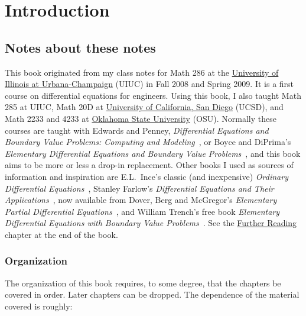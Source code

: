 \chapter*{Introduction} \label{intro:chapter}


\section{Notes about these notes}
\label{notes:section}



This book originated from my class notes for Math 286
at the \href{https://www.math.uiuc.edu/}{University of Illinois at
Urbana-Champaign} (UIUC)
in Fall 2008 and
Spring 2009.
It is a first course on differential equations for engineers.
Using this book, I also taught Math 285 at UIUC\@,
Math 20D at
\href{https://www.math.ucsd.edu/}{University of California, San Diego} (UCSD),
and Math 2233 and 4233 at 
\href{https://math.okstate.edu/}{Oklahoma State University} (OSU).
Normally these courses are taught with
Edwards and Penney, \emph{Differential
Equations and Boundary Value Problems: Computing and Modeling}~\cite{EP}, or
Boyce and DiPrima's
\emph{Elementary
Differential Equations and Boundary Value Problems}~\cite{BD},
and this book aims to be more or less a drop-in replacement.
Other books I used as sources of information and inspiration
are E.L.\ Ince's classic (and inexpensive)
\emph{Ordinary Differential Equations}~\cite{I},
Stanley Farlow's \emph{Differential Equations and Their
Applications}~\cite{F}, now available from Dover,
Berg and McGregor's
\emph{Elementary Partial Differential Equations}~\cite{BM},
and William Trench's free book
\emph{Elementary
Differential Equations with Boundary Value Problems}~\cite{T}.
See the \hyperref[furtherreading:chapter]{Further Reading} chapter at the end of the book.

\subsection{Organization}

The organization of this book requires, to some degree,
that the chapters be covered in order.
Later chapters can be dropped.
The dependence of the material covered is roughly:

